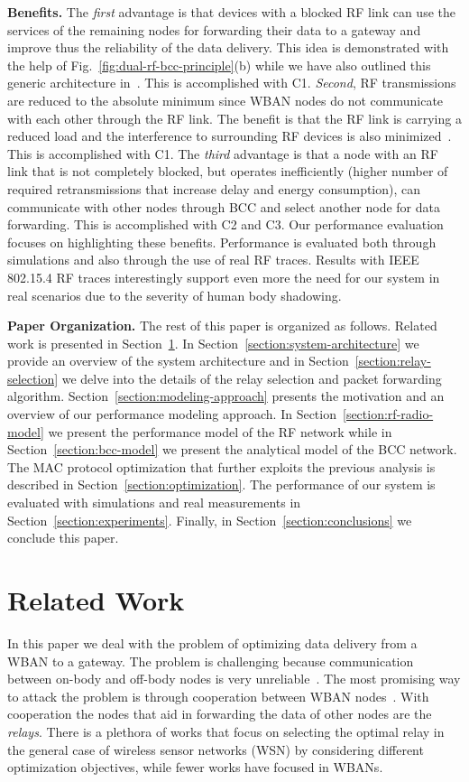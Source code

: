 \documentclass[10pt]{IEEEtran}
\newcounter{section:outage-analysis}
\begin{document}
\textbf{Benefits.} The \textit{first} advantage is that devices with a blocked RF link can use the services of the remaining nodes for forwarding their data to a gateway and improve thus the reliability of the data delivery. This idea is demonstrated with the help of Fig.~\ref{fig:dual-rf-bcc-principle}(b) while we have also outlined this generic architecture in~\cite{zubair}. This is accomplished with C1. \emph{Second}, RF transmissions are reduced to the absolute minimum since WBAN nodes do not communicate with each other through the RF link. The benefit is that the RF link is carrying a reduced load and the interference to surrounding RF devices is also minimized~\cite{baldus09,schenk08}. This is accomplished with C1. The \textit{third} advantage is that a node with an RF link that is not completely blocked, but operates inefficiently (higher number of required retransmissions that increase delay and energy consumption), can communicate with other nodes through BCC and select another node for data forwarding. This is accomplished with C2 and C3.
Our performance evaluation focuses on highlighting these benefits. Performance is evaluated both through simulations and also through the use of real RF traces. Results with IEEE 802.15.4 RF traces interestingly support even more the need for our system in real scenarios due to the severity of human body shadowing.

\textbf{Paper Organization.} The rest of this paper is organized as follows. Related work is presented in Section~\ref{section:related-works}. In Section~\ref{section:system-architecture} we provide an overview of the system architecture and in Section~\ref{section:relay-selection} we delve into the details of the relay selection and packet forwarding algorithm. Section~\ref{section:modeling-approach} presents the motivation and an overview of our performance modeling approach. In Section~\ref{section:rf-radio-model}  we present the performance model of the RF network while in Section~\ref{section:bcc-model} we present the analytical model of the BCC network. The MAC protocol optimization that further exploits the previous analysis is described in Section~\ref{section:optimization}. The performance of our system is evaluated with simulations and real measurements in Section~\ref{section:experiments}. Finally, in Section~\ref{section:conclusions} we conclude this paper.

\section{Related Work}
\label{section:related-works}
In this paper we deal with the problem of optimizing data delivery from a WBAN to a gateway. The problem is challenging because communication between on-body and off-body nodes is very unreliable~\cite{shah06,ruzzelli07}. The most promising way to attack the problem is through cooperation between WBAN nodes~\cite{survey-wban11}. With cooperation the nodes that aid in forwarding the data of other nodes are the \emph{relays}. There is a plethora of works that focus on selecting the optimal relay in the general case of wireless sensor networks (WSN) by considering different optimization objectives, while fewer works have focused in WBANs.
\end{document}
